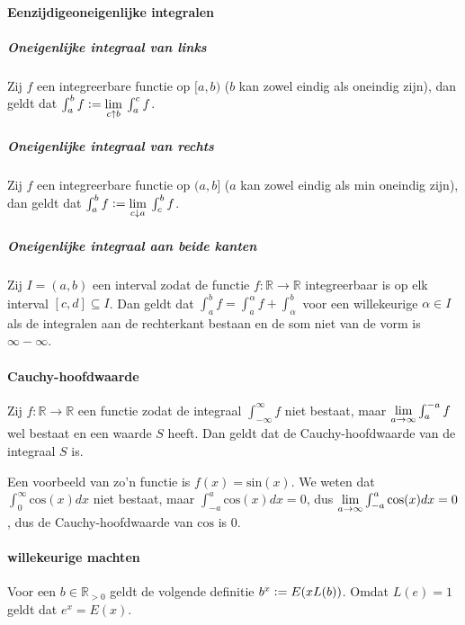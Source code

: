 \paragraph{\bq Eenzijdige\eq oneigenlijke integralen}

\subparagraph{Oneigenlijke integraal van links} Zij $f$ een integreerbare functie op $[a,b)$ ($b$ kan zowel eindig als oneindig zijn), dan geldt dat $\int_{a}^{b}f\vcentcolon=\underset{c\uparrow b}{\text{lim}}\:\int_{a}^{c}f$.

\subparagraph{Oneigenlijke integraal van rechts} Zij $f$ een integreerbare functie op $(a,b]$ ($a$ kan zowel eindig als min oneindig zijn), dan geldt dat $\int_{a}^{b}f\vcentcolon=\underset{c\downarrow a}{\text{lim}}\:\int_{c}^{b}f$.

\subparagraph{Oneigenlijke integraal aan beide kanten} Zij $I=(a,b)$ een interval zodat de functie $f:\mathbb{R}\to\mathbb{R}$ integreerbaar is op elk interval $[c,d]\subseteq I$. Dan geldt dat $\int_{a}^{b}f=\int_{a}^{\alpha}f+\int_{\alpha}^{b}$ voor een willekeurige $\alpha\in I$ als de integralen aan de rechterkant bestaan en de som niet van de vorm is $\infty-\infty$.

\paragraph{Cauchy-hoofdwaarde} Zij $f:\mathbb{R}\to\mathbb{R}$ een functie zodat de integraal $\int_{-\infty}^{\infty}f$ niet bestaat, maar $\underset{a\to\infty}{\text{lim}}\int_{a}^{-a}f$ wel bestaat en een waarde $S$ heeft. Dan geldt dat de Cauchy-hoofdwaarde van de integraal $S$ is. \medskip

Een voorbeeld van zo'n functie is $f(x)=\text{sin}(x)$. We weten dat $\int_{0}^{\infty}\text{cos}(x)dx$ niet bestaat, maar $\int_{-a}^{a}\text{cos}(x)dx=0$, dus $\underset{a\to\infty}{\text{lim}}\int_{-a}^{a}\text{cos}(x)dx=0$, dus de Cauchy-hoofdwaarde van $\text{cos}$ is $0$.

\paragraph{willekeurige machten} Voor een $b\in\mathbb{R}_{>0}$ geldt de volgende definitie $b^{x}\vcentcolon= E(xL(b))$. Omdat $L(e)=1$ geldt dat $e^{x}=E(x)$.
